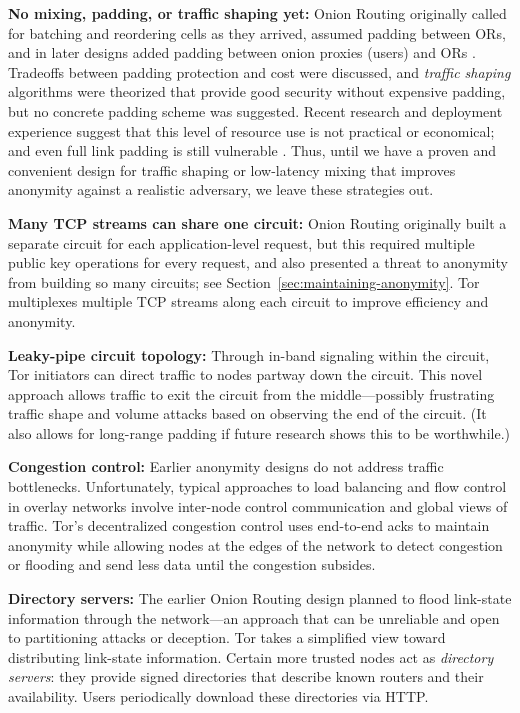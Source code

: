 \documentclass[times,10pt,twocolumn]{article}
\begin{document}
\textbf{No mixing, padding, or traffic shaping yet:} Onion
Routing originally called for batching and reordering cells as they arrived,
assumed padding between ORs, and in
later designs added padding between onion proxies (users) and ORs
\cite{or-ih96,or-jsac98}.  Tradeoffs between padding protection
and cost were discussed, and \emph{traffic shaping} algorithms were
theorized \cite{or-pet00} that provide good security without expensive
padding, but no concrete padding scheme was suggested.
Recent research \cite{econymics}
and deployment experience \cite{freedom21-security} suggest that this
level of resource use is not practical or economical; and even full
link padding is still vulnerable \cite{defensive-dropping}. Thus,
until we have a proven and convenient design for traffic shaping or
low-latency mixing that improves anonymity against a realistic
adversary, we leave these strategies out.

\textbf{Many TCP streams can share one circuit:} Onion Routing originally
built a separate circuit for each
application-level request, but this required
multiple public key operations for every request, and also presented
a threat to anonymity from building so many circuits; see
Section~\ref{sec:maintaining-anonymity}.  Tor multiplexes multiple TCP
streams along each circuit to improve efficiency and anonymity.

\textbf{Leaky-pipe circuit topology:} Through in-band signaling
within the circuit, Tor initiators can direct traffic to nodes partway
down the circuit. This novel approach 
allows traffic to exit the circuit from the middle---possibly
frustrating traffic shape and volume attacks based on observing the end
of the circuit. (It also allows for long-range padding if
future research shows this to be worthwhile.)

\textbf{Congestion control:} Earlier anonymity designs do not
address traffic bottlenecks. Unfortunately, typical approaches to
load balancing and flow control in overlay networks involve inter-node
control communication and global views of traffic. Tor's decentralized
congestion control uses end-to-end acks to maintain anonymity
while allowing nodes at the edges of the network to detect congestion
or flooding and send less data until the congestion subsides.

\textbf{Directory servers:} The earlier Onion Routing design
planned to flood link-state information through the network---an approach
that can be unreliable and open to partitioning attacks or
deception. Tor takes a simplified view toward distributing link-state
information. Certain more trusted nodes act as \emph{directory
servers}: they provide signed directories that describe known
routers and their availability.  Users periodically download these
directories via HTTP.
\end{document}
